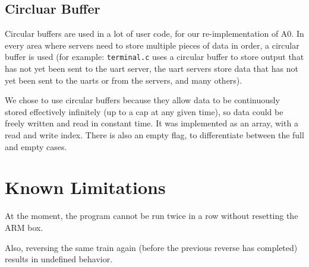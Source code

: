 \documentclass{article}
\begin{document}
\subsection{Circluar Buffer}
    Circular buffers are used in a lot of user code, for our re-implementation of A0. In every area where servers need to store multiple pieces of data in order, a circular buffer is used (for example: \verb|terminal.c| uses a circular buffer to store output that has not yet been sent to the uart server, the uart servers store data that has not yet been sent to the uarts or from the servers, and many others).

    We chose to use circular buffers because they allow data to be continuously stored effectively infinitely (up to a cap at any given time), so data could be freely written and read in constant time. It was implemented as an array, with a read and write index. There is also an empty flag, to differentiate between the full and empty cases.
\section{Known Limitations}
    At the moment, the program cannot be run twice in a row without resetting the ARM box.

    Also, reversing the same train again (before the previous reverse has completed) results in undefined behavior. 
\end{document}

